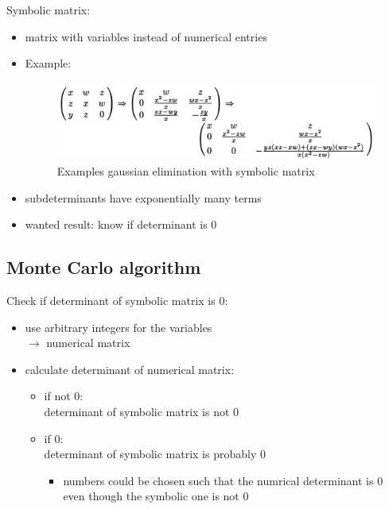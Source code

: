 \documentclass[a4]{scrartcl}
\begin{document}
Symbolic matrix: 
\begin{itemize}
\item matrix with variables instead of numerical entries
\item Example:
\begin{figure}[H]
\begin{center}
\includegraphics[scale=0.5]{gauss2.jpg}
\end{center}
\caption{Examples gaussian elimination with symbolic matrix \cite{book}}
\end{figure}
\item subdeterminants have exponentially many terms
\item wanted result: know if determinant is 0
\end{itemize}
























\subsection*{Monte Carlo algorithm}

Check if determinant of symbolic matrix is 0:
\begin{itemize}
\item use arbitrary integers for the variables \\
$\rightarrow$ numerical matrix
\item calculate determinant of numerical matrix:
\begin{itemize}
\item if not 0: \\
determinant of symbolic matrix is not 0
\item if 0: \\
determinant of symbolic matrix is probably 0
\begin{itemize}
\item numbers could be chosen such that the numrical determinant is 0 even though the symbolic one is not 0
\end{itemize}
\end{itemize}
\end{itemize}
\end{document}
